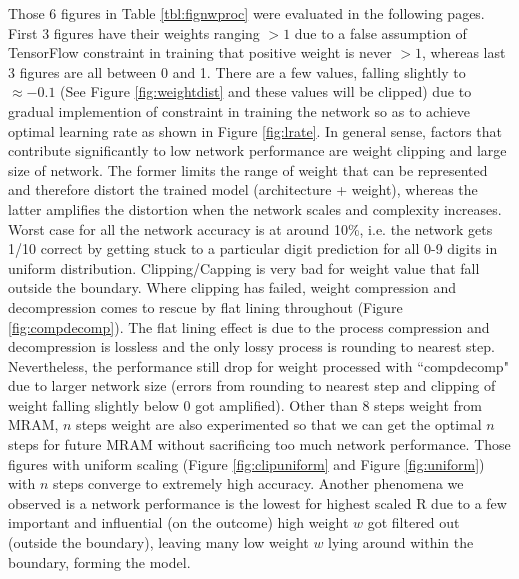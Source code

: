 Those 6 figures in Table \ref{tbl:fignwproc} were evaluated in the following pages. First 3 figures have their weights ranging $>1$ due to a false assumption of TensorFlow constraint in training that positive weight is never $>1$, whereas last 3 figures are all between 0 and 1. There are a few values, falling slightly to $\approx -0.1$ (See Figure \ref{fig:weightdist} and these values will be clipped) due to gradual implemention of constraint in training the network so as to achieve optimal learning rate as shown in Figure \ref{fig:lrate}. In general sense, factors that contribute significantly to low network performance are weight clipping and large size of network. The former limits the range of weight that can be represented and therefore distort the trained model (architecture + weight), whereas the latter amplifies the distortion when the network scales and complexity increases. Worst case for all the network accuracy is at around 10\%, i.e. the network gets 1/10 correct by getting stuck to a particular digit prediction for all 0-9 digits in uniform distribution. Clipping/Capping is very bad for weight value that fall outside the boundary. Where clipping has failed, weight compression and decompression comes to rescue by flat lining throughout (Figure \ref{fig:compdecomp}). The flat lining effect is due to the process compression and decompression is lossless and the only lossy process is rounding to nearest step. Nevertheless, the performance still drop for weight processed with ``compdecomp" due to larger network size (errors from rounding to nearest step and clipping of weight falling slightly below 0 got amplified). Other than 8 steps weight from MRAM, $n$ steps weight are also experimented so that we can get the optimal $n$ steps for future MRAM without sacrificing too much network performance. Those figures with uniform scaling (Figure \ref{fig:clipuniform} and Figure \ref{fig:uniform}) with $n$ steps converge to extremely high accuracy. Another phenomena we observed is a network performance is the lowest for highest scaled R due to a few important and influential (on the outcome) high weight $w$ got filtered out (outside the boundary), leaving many low weight $w$ lying around within the boundary, forming the model.

